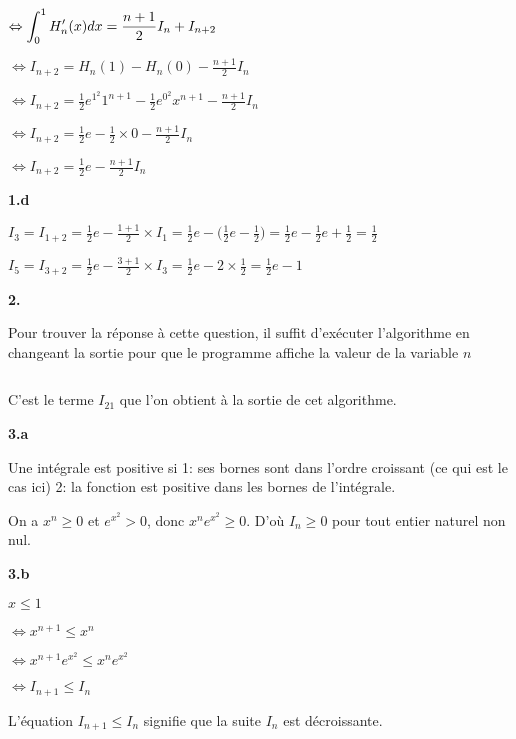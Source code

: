 \documentclass{article}
\newcommand{\vspacem}{\vspace{2mm}}
\newcommand{\bfrac}[2]{\displaystyle\frac{#1}{#2}}
\begin{document}

$\Leftrightarrow \displaystyle\int_0^1 H_n'(x) \space dx = \bfrac{n+1}{2} I_n + I_{n+2}$

$\Leftrightarrow I_{n+2} = H_n(1) - H_n(0) - \bfrac{n+1}{2} I_n$

$\Leftrightarrow I_{n+2} = \bfrac{1}{2} e^{1^2} 1^{n+1} - \bfrac{1}{2} e^{0^2} x^{n+1} - \bfrac{n+1}{2} I_n$

$\Leftrightarrow I_{n+2} = \bfrac{1}{2} e - \bfrac{1}{2} \times 0 - \bfrac{n+1}{2} I_n$

$\Leftrightarrow I_{n+2} = \bfrac{1}{2} e - \bfrac{n+1}{2} I_n$

\vspacem
\textbf{1.d}
\vspacem

$I_3 = I_{1+2} = \bfrac{1}{2} e - \bfrac{1+1}{2} \times I_1 = \bfrac{1}{2} e -\Big(\bfrac{1}{2} e - \bfrac{1}{2}\Big) = \bfrac{1}{2}e - \bfrac{1}{2}e + \bfrac{1}{2} = \bfrac{1}{2}$

$I_5 = I_{3+2} = \bfrac{1}{2} e - \bfrac{3+1}{2} \times I_3 = \bfrac{1}{2} e - 2 \times \bfrac{1}{2} = \bfrac{1}{2} e - 1$

\vspacem
\textbf{2.}
\vspacem

\noindent Pour trouver la réponse à cette question, il suffit d'exécuter l'algorithme en changeant la sortie pour que le programme affiche la valeur de la variable $n$

\inputminted{python}{main.py}

\noindent C'est le terme $I_{21}$  que l'on obtient à la sortie de cet algorithme.

\vspacem
\textbf{3.a}
\vspacem

\noindent Une intégrale est positive si 1: ses bornes sont dans l'ordre croissant (ce qui est le cas ici) 2: la fonction est positive dans les bornes de l'intégrale. 

\noindent On a $x^n \geq 0$ et $e^{x^2} > 0$, donc $x^n e^{x^2} \geq 0$. D'où $I_n \geq 0$ pour tout entier naturel non nul.

\vspacem
\textbf{3.b}
\vspacem

$x \leq 1 $

$\Leftrightarrow x^{n+1} \leq x^n$

$\Leftrightarrow x^{n+1}e^{x^2} \leq x^n e^{x^2}$

$\Leftrightarrow I_{n+1} \leq I_n$

\noindent L'équation $I_{n+1} \leq I_n$ signifie que la suite $I_n$ est décroissante.

\iffalse
\begin{gather*}
x \leq 1\\
\Leftrightarrow x^{n+1} \leq x^n\\
\Leftrightarrow x^{n+1}e^{x^2} \leq x^n e^{x^2}\\
\Leftrightarrow I_{n+1} \leq I_n
\end{gather*} 
\fi
\end{document}
